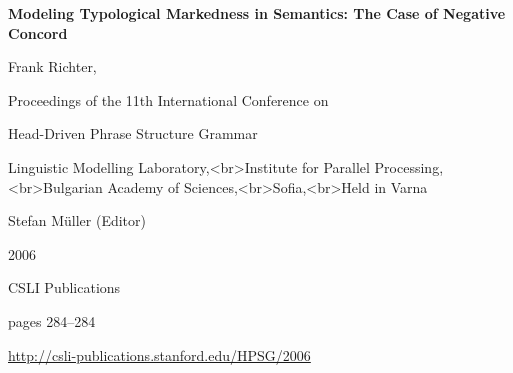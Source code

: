 \documentclass[a4paper,11pt]{article}
\begin{document}
\begin{center}
  {\huge\bf Modeling Typological Markedness in Semantics: The Case of Negative Concord\par}

  \bigskip

  {\LARGE Frank Richter,  \par}

  \vspace*{3\bigskipamount}

  Proceedings of the 11th International Conference on\par Head-Driven Phrase Structure Grammar

  \bigskip

  Linguistic Modelling Laboratory,<br>Institute for Parallel Processing,<br>Bulgarian Academy of Sciences,<br>Sofia,<br>Held in Varna

  \medskip

  Stefan Müller (Editor)

  \medskip

  2006

  \medskip

  CSLI Publications

  \medskip

  pages 284--284

  \medskip

  \url{http://csli-publications.stanford.edu/HPSG/2006}
\end{center}

\newpage

        
\end{document}
